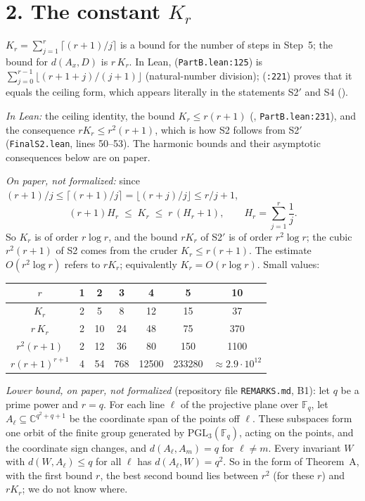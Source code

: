 \documentclass[11pt]{amsart}
\newcommand{\Hr}{H_r}
\begin{document}
\section*{2. The constant $K_r$}

$K_r=\sum_{j=1}^r\lceil (r+1)/j\rceil$ is a bound for the number of steps in Step~5; the bound for $d(A_x,D)$ is
$r\,K_r$. In Lean,  (\texttt{PartB.lean:125}) is $\sum_{j=0}^{r-1}\lfloor (r+1+j)/(j+1)\rfloor$
(natural-number division);  (\texttt{:221}) proves that it equals the ceiling form, which appears
literally in the statements S2$'$ and S4 ().

\emph{In Lean:} the ceiling identity, the bound $K_r\le r(r+1)$ (, \texttt{PartB.lean:231}), and the
consequence $rK_r\le r^2(r+1)$, which is how S2 follows from S2$'$ (\texttt{FinalS2.lean}, lines 50--53). The harmonic bounds and their asymptotic
consequences below are on paper.

\emph{On paper, not formalized:} since $(r+1)/j\le\lceil (r+1)/j\rceil=\lfloor (r+j)/j\rfloor\le r/j+1$,
\[(r+1)\Hr\;\le\;K_r\;\le\;r\,(\Hr+1),\qquad \Hr=\sum_{j=1}^r\frac1j .\]
So $K_r$ is of order $r\log r$, and the bound $rK_r$ of S2$'$ is of order $r^2\log r$; the cubic $r^2(r+1)$ of S2 comes
from the cruder $K_r\le r(r+1)$. The estimate $O(r^2\log r)$ refers to $rK_r$; equivalently $K_r=O(r\log r)$. Small
values:

\begin{center}
\begin{tabular}{c|cccccc}
$r$ & 1 & 2 & 3 & 4 & 5 & 10\\\hline
$K_r$ & 2 & 5 & 8 & 12 & 15 & 37\\
$r\,K_r$ & 2 & 10 & 24 & 48 & 75 & 370\\
$r^2(r+1)$ & 2 & 12 & 36 & 80 & 150 & 1100\\
$r(r+1)^{r+1}$ & 4 & 54 & 768 & 12500 & 233280 & $\approx 2.9\cdot10^{12}$
\end{tabular}
\end{center}

\noindent \emph{Lower bound, on paper, not formalized} (repository file \texttt{REMARKS.md}, B1): let $q$ be a prime power
and $r=q$. For each line $\ell$ of the projective plane over $\mathbb F_q$, let $A_\ell\subseteq\mathbb C^{q^2+q+1}$ be the
coordinate span of the points off $\ell$. These subspaces form one orbit of the finite group generated by
$\mathrm{PGL}_3(\mathbb F_q)$, acting on the points, and the coordinate sign changes, and $d(A_\ell,A_m)=q$ for
$\ell\ne m$. Every invariant $W$ with $d(W,A_\ell)\le q$ for all $\ell$ has $d(A_\ell,W)=q^2$. So in the form of Theorem~A,
with the first bound $r$, the best second bound lies between $r^2$ (for these $r$) and $rK_r$; we do not know where.
\end{document}
